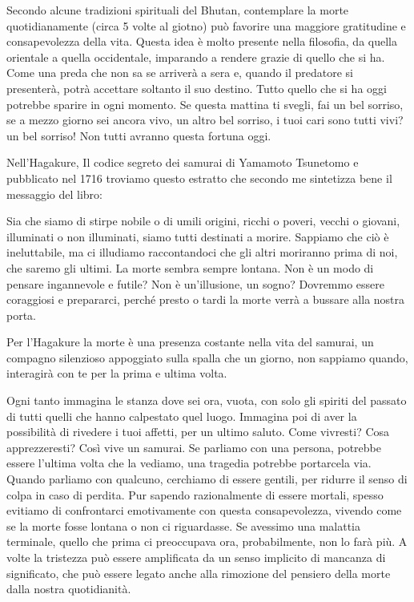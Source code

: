 \documentclass[12pt]{book} %
\begin{document}
Secondo alcune tradizioni spirituali del Bhutan, contemplare la morte quotidianamente (circa 5 volte al giotno) può favorire una maggiore gratitudine e consapevolezza della vita. Questa idea è molto
presente nella filosofia, da quella orientale a quella occidentale, imparando a rendere grazie di quello che si ha.
Come una preda che non sa se arriverà a sera e, quando il predatore si presenterà, potrà accettare soltanto il suo
destino. Tutto quello che si ha oggi potrebbe sparire in ogni momento. 
Se questa mattina ti svegli, fai un bel sorriso, se a mezzo giorno sei ancora vivo, un altro bel sorriso, i tuoi cari sono tutti vivi? un bel sorriso! Non tutti avranno questa fortuna oggi.

Nell'Hagakure, Il codice segreto dei samurai di Yamamoto Tsunetomo e pubblicato nel
1716 troviamo questo
estratto che secondo me sintetizza bene il messaggio del libro:

Sia che siamo di stirpe nobile o di umili origini, ricchi o poveri, vecchi o giovani, illuminati o non illuminati, siamo
tutti destinati a morire. Sappiamo che ciò è ineluttabile, ma ci illudiamo raccontandoci che gli altri moriranno prima
di noi, che saremo gli ultimi. La morte sembra sempre lontana. Non è un modo di pensare ingannevole e futile? Non è
un'illusione, un sogno? Dovremmo essere coraggiosi e prepararci, perché presto o tardi la morte verrà a bussare alla nostra porta.

Per l'Hagakure la morte è una presenza costante nella vita del samurai, un compagno silenzioso
appoggiato sulla spalla che un giorno, non sappiamo quando, interagirà con te per la prima e ultima volta. 

Ogni tanto immagina le stanza dove sei ora, vuota, con solo gli spiriti del passato di tutti quelli che hanno calpestato quel luogo. 
Immagina poi di aver la possibilità di rivedere i tuoi affetti, per un ultimo saluto. Come vivresti? Cosa apprezzeresti?
Così vive un samurai. Se parliamo con una persona, potrebbe essere l'ultima volta che la vediamo, una tragedia potrebbe
portarcela via. Quando parliamo con qualcuno, cerchiamo di essere gentili, per ridurre il senso di colpa in caso di perdita.
Pur sapendo razionalmente di essere mortali, spesso evitiamo di confrontarci emotivamente con questa consapevolezza, vivendo come se la morte fosse lontana o non ci riguardasse. Se avessimo una malattia terminale, quello che prima ci preoccupava ora, probabilmente, non lo farà più. 
A volte la tristezza può essere amplificata da un senso implicito di mancanza di significato, che può essere legato anche alla rimozione del pensiero della morte dalla nostra quotidianità.
\end{document}
